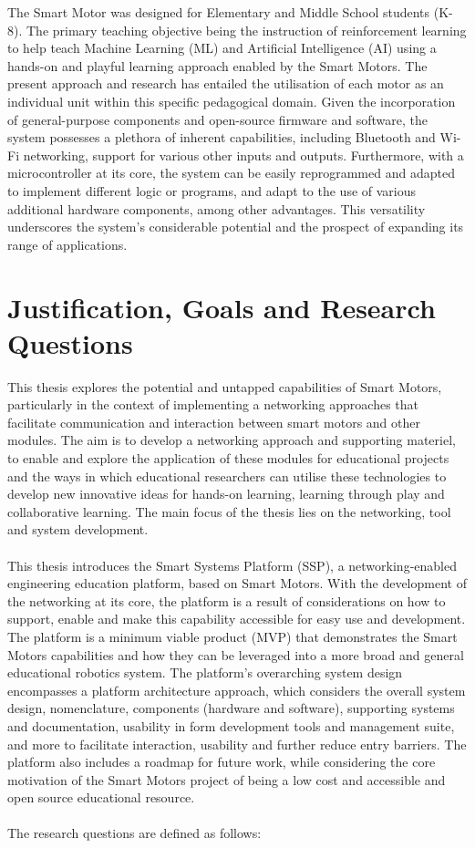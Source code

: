 The Smart Motor was designed for Elementary and Middle School students (K-8). The primary teaching objective being the instruction of reinforcement learning to help teach Machine Learning (ML) and Artificial Intelligence (AI) using a hands-on and playful learning approach enabled by the Smart Motors. The present approach and research has entailed the utilisation of each motor as an individual unit within this specific pedagogical domain. 
Given the incorporation of general-purpose components and open-source firmware and software, the system possesses a plethora of inherent capabilities, including Bluetooth and Wi-Fi networking, support for various other inputs and outputs. Furthermore, with a microcontroller at its core, the system can be easily reprogrammed and adapted to implement different logic or programs, and adapt to the use of various additional hardware components, among other advantages. This versatility underscores the system's considerable potential and the prospect of expanding its range of applications. \citep{dahal_designing_2024}

\section{\label{sec:intro_res_quest}Justification, Goals and Research Questions}

This thesis explores the potential and untapped capabilities of Smart Motors, particularly in the context of implementing a networking approaches that facilitate communication and interaction between smart motors and other modules. The aim is to develop a networking approach and supporting materiel, to enable and explore the application of these modules for educational projects and the ways in which educational researchers can utilise these technologies to develop new innovative ideas for hands-on learning, learning through play and collaborative learning. The main focus of the thesis lies on the networking, tool and system development.
\\\\
This thesis introduces the Smart Systems Platform (SSP), a networking-enabled engineering education platform, based on Smart Motors.
With the development of the networking at its core, the platform is a result of considerations on how to support, enable and make this capability accessible for easy use and development. 
The platform is a minimum viable product (MVP) that demonstrates the Smart Motors capabilities and how they can be leveraged into a more broad and general educational robotics system. The platform's overarching system design encompasses a platform architecture approach, which considers the overall system design, nomenclature, components (hardware and software), supporting systems and documentation, usability in form development tools and management suite, and more to facilitate interaction, usability and further reduce entry barriers. The platform also includes a roadmap for future work, while considering the core motivation of the Smart Motors project of being a low cost and accessible and open source educational resource.
\\\\
The research questions are defined as follows:

